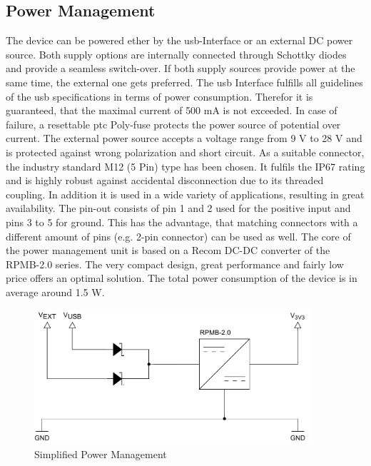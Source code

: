 \subsection{Power Management}
The device can be powered ether by the \acrshort{usb}-Interface or an external DC power source. Both supply options are internally connected through Schottky diodes and provide a seamless switch-over. If both supply sources provide power at the same time, the external one gets preferred.\newline
The \acrfull{usb} Interface fulfills all guidelines of the \acrshort{usb} specifications in terms of power consumption. Therefor it is guaranteed, that the maximal current of 500 mA is not exceeded. In case of failure, a resettable \acrshort{ptc} Poly-fuse protects the power source of potential over current.\newline
The external power source accepts a voltage range from 9 V to 28 V and is protected against wrong polarization and short circuit. As a suitable connector, the industry standard M12 (5 Pin) type has been chosen. It fulfils the IP67 rating and is highly robust against accidental disconnection due to its threaded coupling. In addition it is used in a wide variety of applications, resulting in great availability. The pin-out consists of pin 1 and 2 used for the positive input and pins 3 to 5 for ground. This has the advantage, that matching connectors with a different amount of pins (e.g. 2-pin connector) can be used as well.\newline
The core of the power management unit is based on a Recom DC-DC converter of the RPMB-2.0 series. The very compact design, great performance and fairly low price offers an optimal solution.\newline
The total power consumption of the device is in average around 1.5 W.

\begin{figure}[h!]
	\centering
	\includegraphics[height=5cm]{images/power}
	\caption{Simplified Power Management}
	\vspace{-1.4ex}
	\label{fig:simplified-power}
\end{figure}
\newpage

